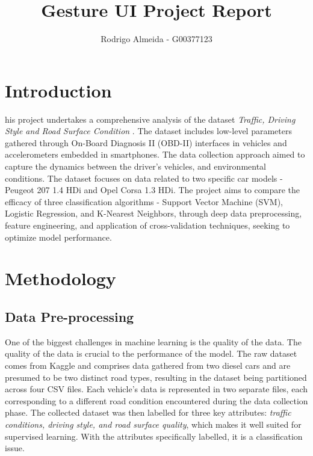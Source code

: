 \documentclass[10pt,journal,compsoc]{IEEEtran}
\begin{document}

\title{Gesture UI Project Report}

\author{Rodrigo Almeida - G00377123%
}

%
{}

\maketitle

\section{Introduction}
\label{sec:introduction}

his project undertakes a comprehensive analysis of the dataset \textit{Traffic, Driving Style and Road Surface Condition} \cite{dataset}. The dataset includes low-level parameters
gathered through On-Board Diagnosis II (OBD-II) interfaces in vehicles and accelerometers embedded in smartphones. The data collection approach aimed to capture the dynamics between the driver's vehicles, and
environmental conditions. The dataset focuses on data related to two specific car models - Peugeot 207 1.4 HDi and Opel Corsa 1.3 HDi.
The project aims to compare the efficacy of three classification algorithms - Support Vector Machine (SVM), Logistic Regression, and K-Nearest Neighbors, through deep data preprocessing, 
feature engineering, and application of cross-validation techniques, seeking to optimize model performance.


\section{Methodology}

\subsection{Data Pre-processing}

One of the biggest challenges in machine learning is the quality of the data. The quality of 
the data is crucial to the performance of the model. The raw dataset comes from Kaggle \cite{dataset} 
and comprises data gathered from two diesel cars and are presumed to be two distinct road types, resulting in the dataset being partitioned across four CSV files. 
Each vehicle's data is represented in two separate files, each corresponding to a different road condition encountered during the data collection phase. The collected dataset was then labelled for three key attributes: 
\textit{traffic conditions, driving style, and road surface quality}, which makes it well suited for supervised learning. With the attributes specifically labelled, it is a classification issue. 
\end{document}
